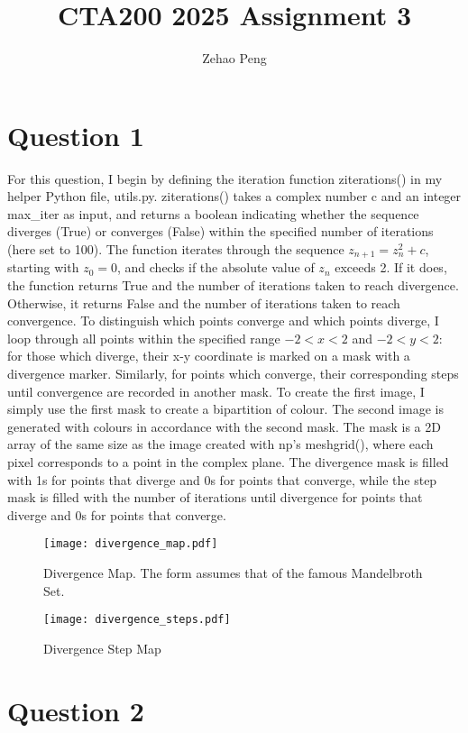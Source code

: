 \documentclass{article}
\title{CTA200 2025 Assignment 3}
\author{Zehao Peng}
\date{}
\begin{document}
\maketitle
\section*{Question 1}

For this question, I begin by defining the iteration function ziterations() in my helper Python file, utils.py. ziterations() takes a complex number c and an integer max\_iter as input, and returns a boolean indicating whether the sequence diverges (True) or converges (False) within the specified number of iterations (here set to 100). The function iterates through the sequence $z_{n+1} = z_n^2 + c$, starting with $z_0 = 0$, and checks if the absolute value of $z_n$ exceeds 2. If it does, the function returns True and the number of iterations taken to reach divergence. Otherwise, it returns False and the number of iterations taken to reach convergence.
To distinguish which points converge and which points diverge, I loop through all points within the specified range $-2 < x < 2$ and $-2 < y < 2$: for those which diverge, their x-y coordinate is marked on a mask with a divergence marker. Similarly, for points which converge, their corresponding steps until convergence are recorded in another mask. To create the first image, I simply use the first mask to create a bipartition of colour. The second image is generated with colours in accordance with the second mask. The mask is a 2D array of the same size as the image created with np's meshgrid(), where each pixel corresponds to a point in the complex plane. The divergence mask is filled with 1s for points that diverge and 0s for points that converge, while the step mask is filled with the number of iterations until divergence for points that diverge and 0s for points that converge.

\begin{figure}[h]
    \centering
    \texttt{[image: divergence\_map.pdf]}
    \caption{Divergence Map. The form assumes that of the famous Mandelbroth Set.}
\end{figure}

\begin{figure}[h]
    \centering
    \texttt{[image: divergence\_steps.pdf]}
    \caption{Divergence Step Map}
\end{figure}

\section*{Question 2}
\end{document}
